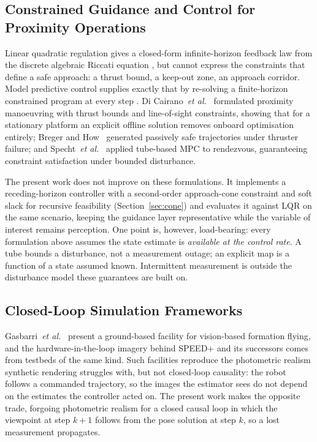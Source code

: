 \subsection{Constrained Guidance and Control for Proximity Operations}
\label{sec:rw_control}

Linear quadratic regulation gives a closed-form infinite-horizon feedback law
from the discrete algebraic Riccati equation \cite{anderson1990}, but cannot
express the constraints that define a safe approach: a thrust bound, a
keep-out zone, an approach corridor. Model predictive control supplies exactly
that by re-solving a finite-horizon constrained program at every step
\cite{mayne2000}. Di Cairano~\textit{et al.}~\cite{dicairano2012mpc}
formulated proximity manoeuvring with thrust bounds and line-of-sight
constraints, showing that for a stationary platform an explicit offline
solution removes onboard optimisation entirely; Breger and
How~\cite{breger2008} generated passively safe trajectories under thruster
failure; and Specht~\textit{et al.}~\cite{specht2023tubempc} applied
tube-based MPC to rendezvous, guaranteeing constraint satisfaction under
bounded disturbance.

The present work does not improve on these formulations. It implements a
receding-horizon controller with a second-order approach-cone constraint and
soft slack for recursive feasibility (Section~\ref{sec:cone}) and evaluates it
against LQR on the same scenario, keeping the guidance layer representative
while the variable of interest remains perception. One point is, however,
load-bearing: every formulation above assumes the state estimate is
\emph{available at the control rate}. A tube bounds a disturbance, not a
measurement outage; an explicit map is a function of a state assumed known.
Intermittent measurement is outside the disturbance model these guarantees are
built on.

\subsection{Closed-Loop Simulation Frameworks}
\label{sec:rw_sim}

Gasbarri~\textit{et al.}~\cite{testbed2014} present a ground-based facility
for vision-based formation flying, and the hardware-in-the-loop imagery behind
SPEED+ and its successors \cite{park2022speedplus,park2026spnv3} comes from
testbeds of the same kind. Such facilities reproduce the photometric realism
synthetic rendering struggles with, but not closed-loop causality: the robot
follows a commanded trajectory, so the images the estimator sees do not depend
on the estimates the controller acted on. The present work makes the opposite
trade, forgoing photometric realism for a closed causal loop in which the
viewpoint at step $k+1$ follows from the pose solution at step $k$, so a lost
measurement propagates.

